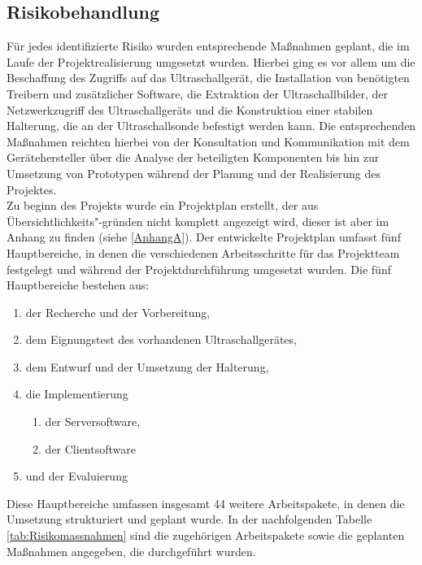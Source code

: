 \subsection{Risikobehandlung} \label{Risikobeh}
Für jedes identifizierte Risiko wurden entsprechende Maßnahmen geplant, die im Laufe der Projektrealisierung umgesetzt wurden. Hierbei ging es vor allem um die Beschaffung des Zugriffs auf das Ultraschallgerät, die Installation von benötigten Treibern und zusätzlicher Software, die Extraktion der Ultraschallbilder, der Netzwerkzugriff des Ultraschallgeräts und die Konstruktion einer stabilen Halterung, die an der Ultraschallsonde befestigt werden kann. Die entsprechenden Maßnahmen reichten hierbei von der Konsultation und Kommunikation mit dem Gerätehersteller über die Analyse der beteiligten Komponenten bis hin zur Umsetzung von Prototypen während der Planung und der Realisierung des Projektes. \\ 
Zu beginn des Projekts wurde ein Projektplan erstellt, der aus Übersichtlichkeits"-gründen nicht komplett angezeigt wird, dieser ist aber im Anhang zu finden (siehe \ref{AnhangA}). Der entwickelte Projektplan umfasst fünf Hauptbereiche, in denen die verschiedenen Arbeitsschritte für das Projektteam festgelegt  und während der Projektdurchführung umgesetzt wurden. Die fünf Hauptbereiche bestehen aus: 
\begin{enumerate}
\item der Recherche und der Vorbereitung,
\item dem Eignungstest des vorhandenen Ultraschallgerätes,
\item dem Entwurf und der Umsetzung der Halterung,
\item die Implementierung 
	\begin{enumerate}
         \item der Serversoftware,
         \item der Clientsoftware
	\end{enumerate}
\item und der Evaluierung
\end{enumerate}

Diese Hauptbereiche umfassen insgesamt 44 weitere Arbeitspakete, in denen die Umsetzung strukturiert und geplant wurde. In der nachfolgenden Tabelle \ref{tab:Risikomassnahmen} sind die zugehörigen Arbeitspakete sowie die geplanten Maßnahmen angegeben, die durchgeführt wurden.

